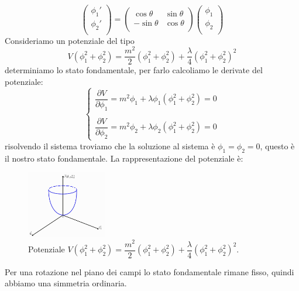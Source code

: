 \begin{equation}
   \begin{pmatrix}
 \phi_1' \\
\phi_2'\\
\end{pmatrix}=\begin{pmatrix}
 \cos{\theta}&\sin{\theta}\\
-\sin{\theta} &\cos{\theta}\\
\end{pmatrix} \begin{pmatrix}
 \phi_1 \\
\phi_2\\
\end{pmatrix}
\end{equation}
Consideriamo un potenziale del tipo
\begin{equation}
    V(\phi_1^2+\phi_2^2)=\dfrac{m^2}{2}(\phi_1^2+\phi_2^2)+\dfrac{\lambda}{4}(\phi_1^2+\phi_2^2)^2
\end{equation}
determiniamo lo stato fondamentale, per farlo calcoliamo le derivate del potenziale:
\begin{equation}
    \begin{cases}
        \dfrac{\partial V}{\partial\phi_1}=m^2\phi_1+\lambda\phi_1(\phi_1^2+\phi_2^2)=0\\
        \\
        \dfrac{\partial V}{\partial\phi_2}=m^2\phi_2+\lambda\phi_2(\phi_1^2+\phi_2^2)=0
    \end{cases}
\end{equation}
risolvendo il sistema troviamo che la soluzione al sistema è $\phi_1=\phi_2=0$, questo è il nostro stato fondamentale.
La rappresentazione del potenziale è: 
\begin{figure}[H]
    \centering
    \includegraphics[width=0.31\textwidth]{Immagini/Pot3.jpg}
    \caption{Potenziale $ V(\phi_1^2+\phi_2^2)=\dfrac{m^2}{2}(\phi_1^2+\phi_2^2)+\dfrac{\lambda}{4}(\phi_1^2+\phi_2^2)^2$.}
    \label{fig:pot3}
\end{figure}
Per una rotazione nel piano dei campi lo stato fondamentale rimane fisso, quindi abbiamo una simmetria ordinaria.



